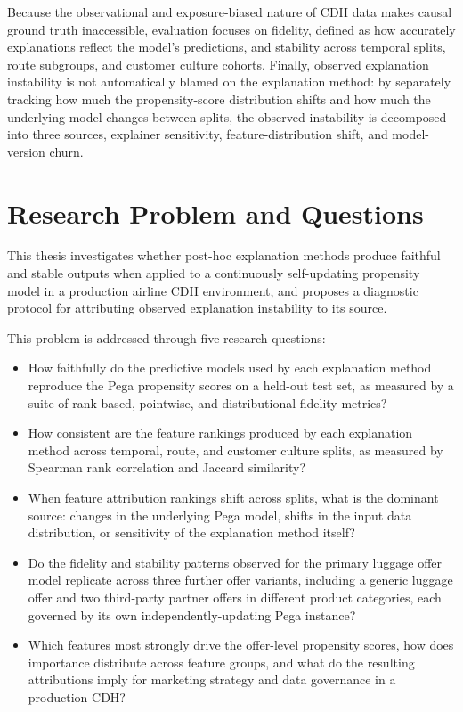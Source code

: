 \documentclass[oneside]{memoir} %
\begin{document}
Because the observational and exposure-biased nature of CDH data makes causal ground truth inaccessible, evaluation focuses on fidelity, defined as how accurately explanations reflect the model’s predictions, and stability across temporal splits, route subgroups, and customer culture cohorts. Finally, observed explanation instability is not automatically blamed on the explanation method: by separately tracking how much the propensity-score distribution shifts and how much the underlying model changes between splits, the observed instability is decomposed into three sources, explainer sensitivity, feature-distribution shift, and model-version churn.

\section{Research Problem and Questions}

\noindent This thesis investigates whether post-hoc explanation methods produce faithful and stable outputs when applied to a continuously self-updating propensity model in a production airline CDH environment, and proposes a diagnostic protocol for attributing observed explanation instability to its source.

\vspace{0.8em}
\noindent This problem is addressed through five research questions:

\begin{itemize}
\item[\textbf{RQ1}] How faithfully do the predictive models used by each explanation method reproduce the Pega propensity scores on a held-out test set, as measured by a suite of rank-based, pointwise, and distributional fidelity metrics?
\item[\textbf{RQ2}] How consistent are the feature rankings produced by each explanation method across temporal, route, and customer culture splits, as measured by Spearman rank correlation and Jaccard similarity?
\item[\textbf{RQ3}] When feature attribution rankings shift across splits, what is the dominant source: changes in the underlying Pega model, shifts in the input data distribution, or sensitivity of the explanation method itself?
\item[\textbf{RQ4}] Do the fidelity and stability patterns observed for the primary luggage offer model replicate across three further offer variants, including a generic luggage offer and two third-party partner offers in different product categories, each governed by its own independently-updating Pega instance?
\item[\textbf{RQ5}] Which features most strongly drive the offer-level propensity scores, how does importance distribute across feature groups, and what do the resulting attributions imply for marketing strategy and data governance in a production CDH?
\end{itemize}
\end{document}
